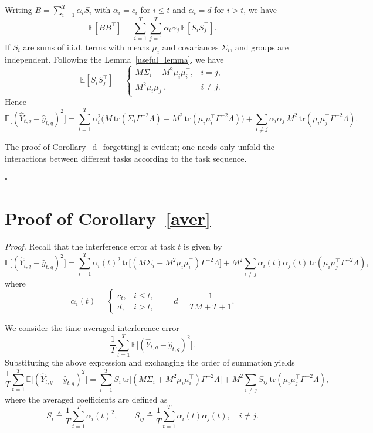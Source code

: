 \documentclass{article}
\theoremstyle{plain}
\theoremstyle{definition}
\theoremstyle{remark}
\begin{document}
Writing \(B=\sum_{i=1}^T\alpha_i S_i\) with \(\alpha_i=c_i\) for \(i\le t\) and \(\alpha_i=d\) for \(i>t\), we have
\[
\mathbb{E}[BB^\top] = \sum_{i=1}^T\sum_{j=1}^T \alpha_i\alpha_j\,\mathbb{E}[S_iS_j^\top].
\]
If \(S_i\) are sums of i.i.d. terms with means \(\mu_i\) and covariances \(\Sigma_i\), and groups are independent. Following the Lemma~\ref{useful_lemma}, we have
\[
\mathbb{E}[S_iS_j^\top] =
\begin{cases}
M\Sigma_i + M^2\mu_i\mu_i^\top, & i=j,\\
M^2\mu_i\mu_j^\top, & i\neq j.
\end{cases}
\]
Hence
\[
\mathbb{E}\big[(\hat{Y}_{t,q}-\hat{y}_{t,q})^2\big]
= \sum_{i=1}^T \alpha_i^2\Big( M\,\mathrm{tr}(\Sigma_i \Gamma^{-2}\Lambda) + M^2\,\mathrm{tr}(\mu_i\mu_i^\top \Gamma^{-2}\Lambda)\Big)
+ \sum_{i\neq j}\alpha_i\alpha_j\,M^2\,\mathrm{tr}(\mu_i\mu_j^\top \Gamma^{-2}\Lambda).
\]

The proof of Corollary~\ref{d_forgetting} is evident; one needs only unfold the interactions between different tasks according to the task sequence.

\hfill$\square$


\vspace{-0.1in}\section{Proof of Corollary~\ref{aver}}
\textit{Proof.} Recall that the interference error at task $t$ is given by
\[
\mathbb{E}\big[(\hat{Y}_{t,q}-\hat y_{t,q})^2\big]
=
\sum_{i=1}^T \alpha_i(t)^2
\,\mathrm{tr}\!\big[(M\Sigma_i+M^2\mu_i\mu_i^\top)\Gamma^{-2}\Lambda\big]
+
M^2\!\sum_{i\ne j}\alpha_i(t)\alpha_j(t)\,
\mathrm{tr}(\mu_i\mu_j^\top\Gamma^{-2}\Lambda),
\]
where
\[
\alpha_i(t)=
\begin{cases}
c_t, & i\le t,\\
d, & i>t,
\end{cases}
\qquad
d=\dfrac{1}{TM+T+1}.
\]

We consider the time-averaged interference error
\[
\frac{1}{T}\sum_{t=1}^T \mathbb{E}\big[(\hat{Y}_{t,q}-\hat y_{t,q})^2\big].
\]
Substituting the above expression and exchanging the order of summation yields
\[
\frac{1}{T}\sum_{t=1}^T \mathbb{E}\big[(\hat{Y}_{t,q}-\hat y_{t,q})^2\big]
=
\sum_{i=1}^T S_i
\,\mathrm{tr}\!\big[(M\Sigma_i+M^2\mu_i\mu_i^\top)\Gamma^{-2}\Lambda\big]
+
M^2\!\sum_{i\ne j} S_{ij}\,
\mathrm{tr}(\mu_i\mu_j^\top\Gamma^{-2}\Lambda),
\]
where the averaged coefficients are defined as
\[
S_i \triangleq \frac{1}{T}\sum_{t=1}^T \alpha_i(t)^2,
\qquad
S_{ij} \triangleq \frac{1}{T}\sum_{t=1}^T \alpha_i(t)\alpha_j(t),
\quad i\ne j.
\]
\end{document}
